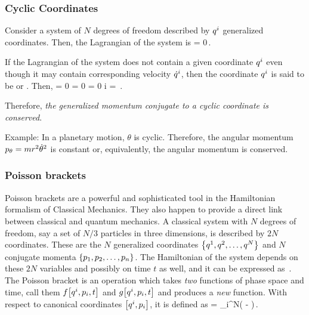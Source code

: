 \subsubsection{Cyclic Coordinates}
Consider a system of $N$ degrees of freedom described by ${q}^{i}$ generalized coordinates. Then, the Lagrangian of the system is
\beq
{} = 0\,.
\eeq

If the Lagrangian of the system does not contain a given coordinate ${q}^{i}$ even though it may contain corresponding velocity ${\dot{q}}^{i}$, then the coordinate ${q}^{i}$ is said to be  or . Then,
\beq
          = 0\implies
{} = 0\implies
               = 0\implies
                     \gmom i = \,.
\eeq

Therefore, \emph{the generalized momentum conjugate to a cyclic coordinate is conserved}. 

Example: In a planetary motion, $\theta$ is cyclic. Therefore, the angular momentum ${p}_{\theta} = mr^2\dot{\theta}^2$ is constant or, equivalently, the angular momentum is conserved.


\subsubsection{Poisson brackets}
Poisson brackets are a powerful and sophisticated tool in the Hamiltonian formalism of Classical Mechanics. They also happen to provide a direct link between classical and quantum mechanics. A classical system with $N$ degrees of freedom, say a set of $N/3$ particles in three dimensions, is described by $2N$  coordinates. These are the $N$ generalized coordinates $\left\lbrace{{q}^{1}, {q}^{2}, \dotsc, {q}^{N}}\right\rbrace$ and $N$ conjugate momenta $\left\lbrace{{p}_{1}, {p}_{2}, \dotsc, {p}_{n}}\right\rbrace$. The Hamiltonian of the system depends on these $2N$ variables and possibly on time $t$ as well, and it can be expressed as
\beq
\ham{}\ham{}\,.
\eeq
The Poisson bracket is an operation which takes \emph{two} functions of phase space and time, call them $f\!\left[{{q}^{i}, {p}_{i}, t}\right]$ and $g\!\left[{{q}^{i}, {p}_{i}, t}\right]$ and produces a \emph{new} function. With respect to canonical coordinates $\left[{{q}^{i}, {p}_{i}}\right]$, it is defined as
\beq
{} = \sum_i^N\left(  -  \right)\,.
\eeq

